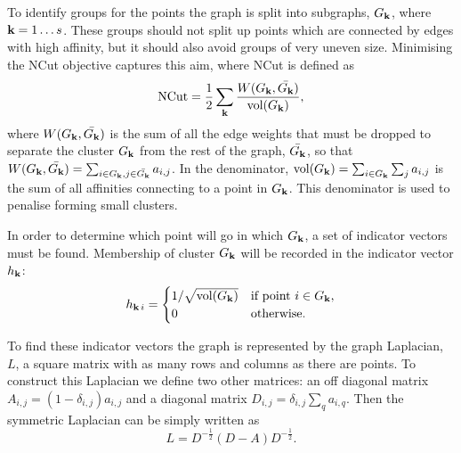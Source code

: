 To identify groups for the points the graph is split into subgraphs,
\(G_{\textbf{k}}\), where \(\textbf{k}=1 \dots s\).
These groups should not split up points which are connected by edges with high affinity,
but it should also avoid groups of very uneven size.
Minimising the NCut objective captures this aim, where NCut is defined as
\begin{equation}
    \text{NCut} = \frac{1}{2}\sum_{\textbf{k}}\frac{W(G_{\textbf{k}}, \bar{G_{\textbf{k}}})}{\text{vol}(G_{\textbf{k}})},
\end{equation}\label{eqn:cost_function}
where \(W(G_{\textbf{k}}, \bar{G_{\textbf{k}}})\) is the sum of all the edge weights that must be dropped
to separate the cluster \(G_{\textbf{k}}\) from the rest of the graph, \(\bar{G_{\textbf{k}}}\),
so that \( W(G_{\textbf{k}}, \bar{G_{\textbf{k}}}) = \sum_{i \in G_{\textbf{k}}, j \in \bar{G_{\textbf{k}}}} a_{i, j} \).
In the denominator, \(\text{vol}(G_{\textbf{k}}) = \sum_{i \in G_{\textbf{k}}} \sum_{j} a_{i, j}\) is 
the sum of all affinities connecting to a point in \(G_{\textbf{k}}\).
This denominator is used to penalise forming small clusters.

In order to determine which point will go in which \(G_{\textbf{k}}\), a set of indicator vectors must be found.
Membership of cluster \(G_{\textbf{k}}\) will be recorded in the indicator vector \(h_{\textbf{k}}\):
\begin{equation}\label{eqn:indicator}
    h_{\textbf{k}\,i}= 
    \begin{cases}
        1/\sqrt{\text{vol}(G_{\textbf{k}})}& \text{if point } i \in G_{\textbf{k}} ,\\
        0             & \text{otherwise}.
    \end{cases}
\end{equation}

To find these indicator vectors the graph is represented by the graph Laplacian, \(L\), a square
matrix with as many rows and columns as there are points.
To construct this Laplacian we define two other matrices:
an off diagonal matrix 
\(A_{i, j} = (1 - \delta_{i, j})a_{i, j}\)
and a diagonal matrix
\(D_{i, j} = \delta_{i, j}\sum_q a_{i, q}\).
Then the symmetric Laplacian can be simply written as
\begin{equation}\label{eqn:symmetric_laplacian}
    L = D^{-\frac{1}{2}} (D - A) D^{-\frac{1}{2}}.
\end{equation}


